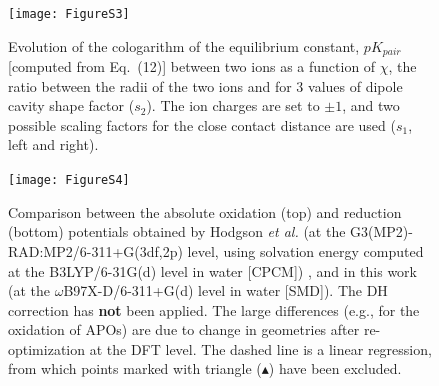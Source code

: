 \documentclass[11pt,a4paper]{article}
\begin{document}
\begin{figure}[!h]
\centering
\texttt{[image: FigureS3]}
\caption{Evolution of the cologarithm of the equilibrium constant, $pK_{pair}$ [computed from Eq.~(12)] between two ions as a function of $\chi$, the ratio between the radii of the two ions and for 3 values of dipole cavity shape factor ($s_2$). The ion charges are set to $\pm 1$, and two possible scaling factors for  the close contact distance are used ($s_1$, left and right). }
\end{figure}


\begin{figure}[!h]
	\centering
	\texttt{[image: FigureS4]}
	\caption{Comparison between the absolute oxidation (top) and reduction (bottom) potentials obtained by Hodgson \emph{et al.} (at the G3(MP2)-RAD:MP2/6-311+G(3df,2p) level, using solvation energy computed at the B3LYP/6-31G(d) level in water [CPCM]) \cite{hodgsonOneElectronOxidationReduction2007}, and in this work (at the $\omega$B97X-D/6-311+G(d) level in water [SMD]). The DH correction has \textbf{not} been applied. The large differences (e.g., for the oxidation of APOs) are due to change in geometries after re-optimization at the DFT level. The dashed line is a linear regression, from which points marked with triangle ($\blacktriangle$) have been excluded.}
\end{figure}
\end{document}
